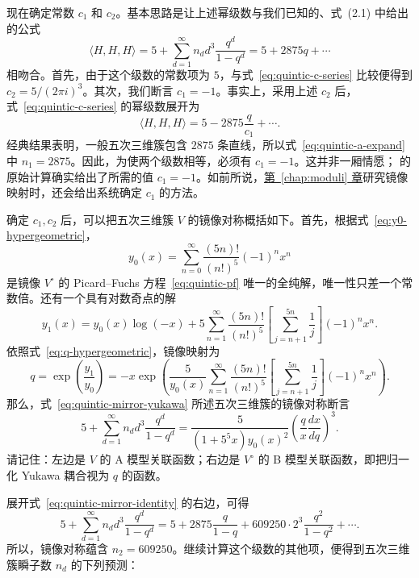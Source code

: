 现在确定常数 $c_1$ 和 $c_2$。基本思路是让上述幂级数与我们已知的、式~(2.1) 中给出的公式
\begin{equation}\label{eq:quintic-a-expand}
\langle H,H,H\rangle=5+\sum_{d=1}^{\infty}n_d d^3\frac{q^d}{1-q^d}
=5+2875q+\cdots
\end{equation}
相吻合。首先，由于这个级数的常数项为 $5$，与式~\eqref{eq:quintic-c-series} 比较便得到 $c_2=5/(2\pi i)^3$。其次，我们断言 $c_1=-1$。事实上，采用上述 $c_2$ 后，式~\eqref{eq:quintic-c-series} 的幂级数展开为
\[
\langle H,H,H\rangle=5-2875\frac q{c_1}+\cdots.
\]
经典结果表明，一般五次三维簇包含 $2875$ 条直线，所以式~\eqref{eq:quintic-a-expand} 中 $n_1=2875$。因此，为使两个级数相等，必须有 $c_1=-1$。这并非一厢情愿； 的原始计算确实给出了所需的值 $c_1=-1$。如前所说，\hyperref[chap:moduli]{第~\ref*{chap:moduli} 章}研究镜像映射时，还会给出系统确定 $c_1$ 的方法。

确定 $c_1,c_2$ 后，可以把五次三维簇 $V$ 的镜像对称概括如下。首先，根据式~\eqref{eq:y0-hypergeometric}，
\begin{equation}\label{eq:quintic-y0-final}
y_0(x)=\sum_{n=0}^{\infty}\frac{(5n)!}{(n!)^5}(-1)^nx^n
\end{equation}
是镜像 $V^\circ$ 的 Picard--Fuchs 方程~\eqref{eq:quintic-pf} 唯一的全纯解，唯一性只差一个常数倍。还有一个具有对数奇点的解
\begin{equation}\label{eq:quintic-y1-final}
y_1(x)=y_0(x)\log(-x)
+5\sum_{n=1}^{\infty}\frac{(5n)!}{(n!)^5}
\left[\sum_{j=n+1}^{5n}\frac1j\right](-1)^nx^n.
\end{equation}
依照式~\eqref{eq:q-hypergeometric}，镜像映射为
\begin{equation}\label{eq:quintic-q-final}
q=\exp\!\left(\frac{y_1}{y_0}\right)
=-x\exp\!\left(\frac5{y_0(x)}\sum_{n=1}^{\infty}\frac{(5n)!}{(n!)^5}
\left[\sum_{j=n+1}^{5n}\frac1j\right](-1)^nx^n\right).
\end{equation}
那么，式~\eqref{eq:quintic-mirror-yukawa} 所述五次三维簇的镜像对称断言
\begin{equation}\label{eq:quintic-mirror-identity}
5+\sum_{d=1}^{\infty}n_dd^3\frac{q^d}{1-q^d}
=\frac5{(1+5^5x)y_0(x)^2}\left(\frac qx\frac{dx}{dq}\right)^3.
\end{equation}
请记住：左边是 $V$ 的 A 模型关联函数；右边是 $V^\circ$ 的 B 模型关联函数，即把归一化 Yukawa 耦合视为 $q$ 的函数。

展开式~\eqref{eq:quintic-mirror-identity} 的右边，可得
\begin{equation}\label{eq:quintic-first-coefficients}
5+\sum_{d=1}^{\infty}n_dd^3\frac{q^d}{1-q^d}
=5+2875\frac q{1-q}+609250\cdot2^3\frac{q^2}{1-q^2}+\cdots.
\end{equation}
所以，镜像对称蕴含 $n_2=609250$。继续计算这个级数的其他项，便得到五次三维簇瞬子数 $n_d$ 的下列预测：

